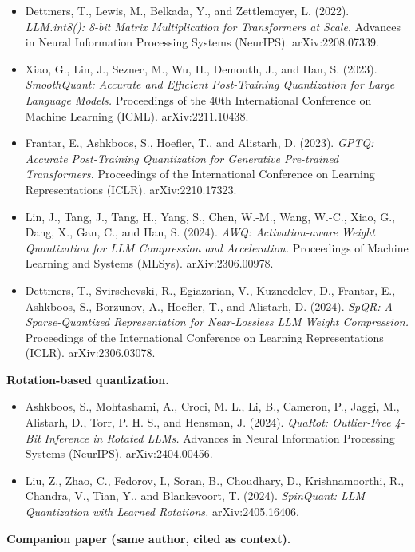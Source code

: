 \begin{itemize}
\tightlist
\item
  Dettmers, T., Lewis, M., Belkada, Y., and Zettlemoyer, L. (2022).
  \emph{LLM.int8(): 8-bit Matrix Multiplication for Transformers at
  Scale.} Advances in Neural Information Processing Systems (NeurIPS).
  arXiv:2208.07339.
\item
  Xiao, G., Lin, J., Seznec, M., Wu, H., Demouth, J., and Han, S.
  (2023). \emph{SmoothQuant: Accurate and Efficient Post-Training
  Quantization for Large Language Models.} Proceedings of the 40th
  International Conference on Machine Learning (ICML). arXiv:2211.10438.
\item
  Frantar, E., Ashkboos, S., Hoefler, T., and Alistarh, D. (2023).
  \emph{GPTQ: Accurate Post-Training Quantization for Generative
  Pre-trained Transformers.} Proceedings of the International Conference
  on Learning Representations (ICLR). arXiv:2210.17323.
\item
  Lin, J., Tang, J., Tang, H., Yang, S., Chen, W.-M., Wang, W.-C., Xiao,
  G., Dang, X., Gan, C., and Han, S. (2024). \emph{AWQ: Activation-aware
  Weight Quantization for LLM Compression and Acceleration.} Proceedings
  of Machine Learning and Systems (MLSys). arXiv:2306.00978.
\item
  Dettmers, T., Svirschevski, R., Egiazarian, V., Kuznedelev, D.,
  Frantar, E., Ashkboos, S., Borzunov, A., Hoefler, T., and Alistarh, D.
  (2024). \emph{SpQR: A Sparse-Quantized Representation for
  Near-Lossless LLM Weight Compression.} Proceedings of the
  International Conference on Learning Representations (ICLR).
  arXiv:2306.03078.
\end{itemize}

\textbf{Rotation-based quantization.}

\begin{itemize}
\tightlist
\item
  Ashkboos, S., Mohtashami, A., Croci, M. L., Li, B., Cameron, P.,
  Jaggi, M., Alistarh, D., Torr, P. H. S., and Hensman, J. (2024).
  \emph{QuaRot: Outlier-Free 4-Bit Inference in Rotated LLMs.} Advances
  in Neural Information Processing Systems (NeurIPS). arXiv:2404.00456.
\item
  Liu, Z., Zhao, C., Fedorov, I., Soran, B., Choudhary, D.,
  Krishnamoorthi, R., Chandra, V., Tian, Y., and Blankevoort, T. (2024).
  \emph{SpinQuant: LLM Quantization with Learned Rotations.}
  arXiv:2405.16406.
\end{itemize}

\textbf{Companion paper (same author, cited as context).}

